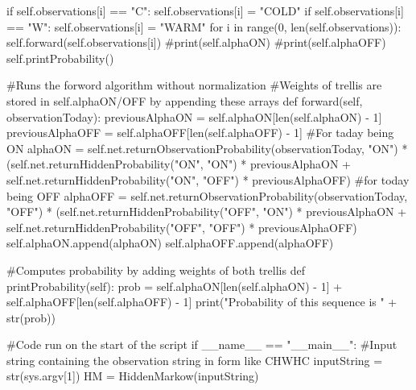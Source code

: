 \documentclass[10pt]{article}
\begin{document}
\begin{spverbatim}
            if self.observations[i] == "C":
                self.observations[i] = "COLD"
            if self.observations[i] == "W":
                self.observations[i] = "WARM"
        for i in range(0,  len(self.observations)):
            self.forward(self.observations[i])
        #print(self.alphaON)
        #print(self.alphaOFF)
        self.printProbability()
     
    #Runs the forword algorithm without normalization
    #Weights of trellis are stored in self.alphaON/OFF by appending these arrays
    def forward(self, observationToday):
        previousAlphaON = self.alphaON[len(self.alphaON) - 1]
        previousAlphaOFF = self.alphaOFF[len(self.alphaOFF) - 1]
        #For taday being ON
        alphaON = self.net.returnObservationProbability(observationToday, "ON") * (self.net.returnHiddenProbability("ON", "ON") * previousAlphaON + self.net.returnHiddenProbability("ON", "OFF") * previousAlphaOFF)
        #for today being OFF
        alphaOFF = self.net.returnObservationProbability(observationToday, "OFF") * (self.net.returnHiddenProbability("OFF", "ON") * previousAlphaON + self.net.returnHiddenProbability("OFF", "OFF") * previousAlphaOFF)
        self.alphaON.append(alphaON)
        self.alphaOFF.append(alphaOFF)

    #Computes probability by adding weights of both trellis
    def printProbability(self):
        prob = self.alphaON[len(self.alphaON) - 1] + self.alphaOFF[len(self.alphaOFF) - 1]
        print("Probability of this sequence is " + str(prob))

#Code run on the start of the script
if __name__ == "__main__":
    #Input string containing the observation string in form like CHWHC
    inputString = str(sys.argv[1])
    HM = HiddenMarkow(inputString)


\end{spverbatim}
\end{document}
